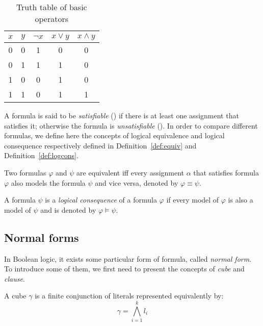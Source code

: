 \begin{table}[!htbp]
 \centering
 \begin{tabular}{cc|ccc}
  $x$ & $y$ & $\neg x$ & $x \lor y$ & $x \land y$ \\
  \toprule
  0 & 0 & 1 & 0 & 0 \\
  \midrule
  0 & 1 & 1 & 1 & 0 \\
  \midrule
  1 & 0 & 0 & 1 & 0 \\
  \midrule
  1 & 1 & 0 & 1 & 1 \\
  \bottomrule
 \end{tabular}
 \caption{Truth table of basic operators}
 \label{tab:truthtable}
\end{table}
A formula is said to be
\emph{satisfiable} (\sat) if there is at least one assignment that satisfies it;
otherwise the formula is \emph{unsatisfiable} (\unsat).
In order to compare different formulas, we define here the concepts of logical equivalence and logical consequence
respectively defined in Definition~\ref{def:equiv} and Definition~\ref{def:logcons}.

\vspace{1em}

\begin{definition}\label{def:equiv}
 Two formulas $\varphi$ and $\psi$ are equivalent iff every assignment $\alpha$ that satisfies 
 formula $\varphi$  also models the formula $\psi$ and vice versa, denoted by $\varphi \equiv \psi$.
\end{definition}


\begin{definition}\label{def:logcons}
 A formula $\psi$ is a \emph{logical consequence} of a formula $\varphi$ if every model of $\varphi$
 is also a model of $\psi$ and is denoted by $\varphi \models \psi$.
\end{definition}

\subsection{Normal forms}
In Boolean logic, it exists some particular form of formula, called \emph{normal form}.
 To introduce some of them, we first need to present the concepts of \emph{cube} and \emph{clause}.
\begin{definition}[Cube]
A cube $\gamma$ is a finite conjunction of literals represented equivalently by:
$$\gamma = \bigwedge_{i=1}^k l_i $$
\end{definition}

